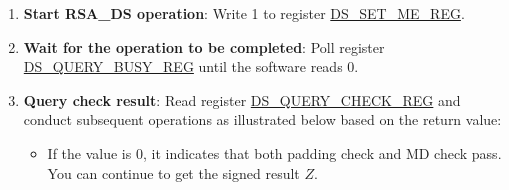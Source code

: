 \documentclass[main\_\_EN.tex]{subfiles}
\begin{document}
\begin{enumerate}
\begin{itemize}
        \item Write \begin{math}\widehat{\overline{r}}_{i}\end{math}
        (\begin{math}i \in \{ 0, 1, \dots, 95 \} \end{math})
        to \hyperref[DSRBMEM]{DS\_RB\_MEM}.
        
        \item write \begin{math}\widehat{Box}_{i}\end{math}
        (\begin{math}i \in \{ 0, 1, \dots, 11 \} \end{math})
        to \hyperref[DSBOXMEM]{DS\_BOX\_MEM}.
        
        The capacity of
        \hyperref[DSYMEM]{DS\_Y\_MEM}, 
        \hyperref[DSMMEM]{DS\_M\_MEM}, and
        \hyperref[DSRBMEM]{DS\_RB\_MEM} is 96 words, whereas the capacity of
        \hyperref[DSBOXMEM]{DS\_BOX\_MEM} is only 12 words.
        Each word can store one base-\begin{math}b\end{math} digit. The memory blocks use the little endian format for storage, i.e., the least significant digit of the operand is in the lowest address.
     
    \end{itemize}
        

    \item {\bfseries Start RSA\_DS operation}: Write 1 to register \hyperref[regdesc:DSSETMEREG]{DS\_SET\_ME\_REG}.

    \item {\bfseries Wait for the operation to be completed}: Poll register \hyperref[regdesc:DSQUERYBUSYREG]{DS\_QUERY\_BUSY\_REG} until the software reads 0.

    \item {\bfseries Query check result}: Read register \hyperref[regdesc:DSQUERYCHECKREG]{DS\_QUERY\_CHECK\_REG} and conduct subsequent operations as illustrated below based on the return value:
    
    \begin{itemize}
    
        \item If the value is 0, it indicates that both padding check and MD check pass. You can continue to get the signed result \begin{math}Z\end{math}.
        

\end{itemize}
\end{enumerate}
\end{document}
